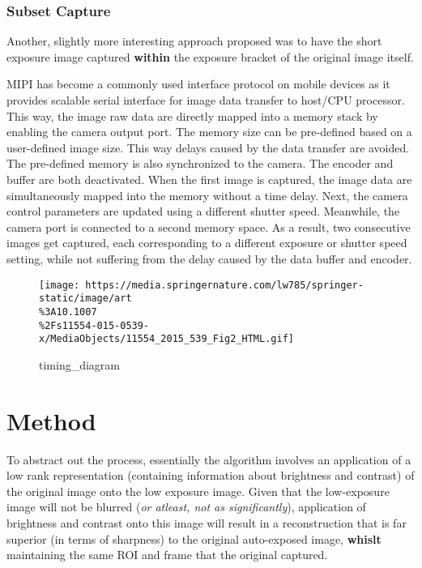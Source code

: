 \hypertarget{subset-capture}{%
\subsubsection{Subset Capture}\label{subset-capture}}

Another, slightly more interesting approach proposed was to have the
short exposure image captured \textbf{within} the exposure bracket of
the original image itself.

MIPI has become a commonly used interface protocol on mobile devices as
it provides scalable serial interface for image data transfer to
host/CPU processor. This way, the image raw data are directly mapped
into a memory stack by enabling the camera output port. The memory size
can be pre-defined based on a user-defined image size. This way delays
caused by the data transfer are avoided. The pre-defined memory is also
synchronized to the camera. The encoder and buffer are both deactivated.
When the first image is captured, the image data are simultaneously
mapped into the memory without a time delay. Next, the camera control
parameters are updated using a different shutter speed. Meanwhile, the
camera port is connected to a second memory space. As a result, two
consecutive images get captured, each corresponding to a different
exposure or shutter speed setting, while not suffering from the delay
caused by the data buffer and encoder.

\begin{figure}
  \begin{center}
  \texttt{[image: https://media.springernature.com/lw785/springer-static/image/art\\\%3A10.1007\\\%2Fs11554-015-0539-x/MediaObjects/11554\_2015\_539\_Fig2\_HTML.gif]}
  \caption{timing\_diagram}
  \end{center}
\end{figure}

\hypertarget{method}{%
\section{Method}\label{method}}

To abstract out the process, essentially the algorithm involves an
application of a low rank representation (containing information about
brightness and contrast) of the original image onto the low exposure
image. Given that the low-exposure image will not be blurred (\emph{or
atleast, not as significantly}), application of brightness and contrast
onto this image will result in a reconstruction that is far superior (in
terms of sharpness) to the original auto-exposed image, \textbf{whislt}
maintaining the same ROI and frame that the original captured.

